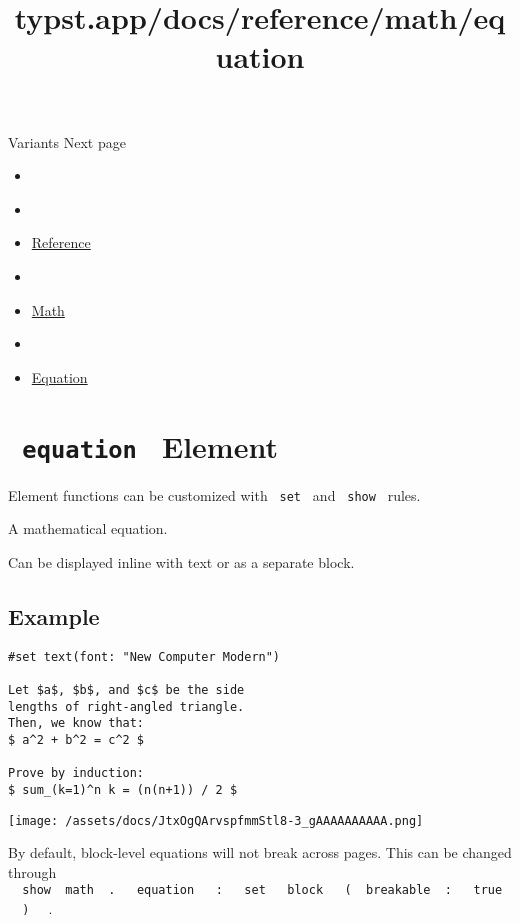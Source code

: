 { Variants } { Next page }


\title{typst.app/docs/reference/math/equation}

\begin{itemize}
\tightlist
\item
  \href{/docs}{}
\item
  
\item
  \href{/docs/reference/}{Reference}
\item
  
\item
  \href{/docs/reference/math/}{Math}
\item
  
\item
  \href{/docs/reference/math/equation/}{Equation}
\end{itemize}

\section{\texorpdfstring{\texttt{\ equation\ } {{ Element
}}}{ equation   Element }}\label{summary}

\label{element-tooltip}
Element functions can be customized with \texttt{\ set\ } and
\texttt{\ show\ } rules.

A mathematical equation.

Can be displayed inline with text or as a separate block.

\subsection{Example}\label{example}

\begin{verbatim}
#set text(font: "New Computer Modern")

Let $a$, $b$, and $c$ be the side
lengths of right-angled triangle.
Then, we know that:
$ a^2 + b^2 = c^2 $

Prove by induction:
$ sum_(k=1)^n k = (n(n+1)) / 2 $
\end{verbatim}

\texttt{[image: /assets/docs/JtxOgQArvspfmmStl8-3\_gAAAAAAAAAA.png]}

By default, block-level equations will not break across pages. This can
be changed through
\texttt{\ }{\texttt{\ show\ }}\texttt{\ math\ }{\texttt{\ .\ }}\texttt{\ }{\texttt{\ equation\ }}\texttt{\ }{\texttt{\ :\ }}\texttt{\ }{\texttt{\ set\ }}\texttt{\ }{\texttt{\ block\ }}\texttt{\ }{\texttt{\ (\ }}\texttt{\ breakable\ }{\texttt{\ :\ }}\texttt{\ }{\texttt{\ true\ }}\texttt{\ }{\texttt{\ )\ }}\texttt{\ }
.

